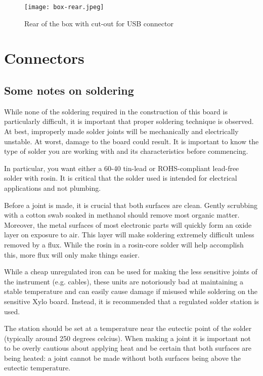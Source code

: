 \begin{figure}
  \center
  \texttt{[image: box-rear.jpeg]}
  \caption{Rear of the box with cut-out for USB connector}
  \label{fig:box-rear}
\end{figure}

\section{Connectors}

\subsection{Some notes on soldering}

While none of the soldering required in the construction of this board
is particularly difficult, it is important that proper soldering
technique is observed. At best, improperly made solder joints will be
mechanically and electrically unstable. At worst, damage to the board
could result. It is important to know the type of solder you are
working with and its characteristics before commencing.

In particular, you want either a 60-40 tin-lead or ROHS-compliant
lead-free solder with rosin. It is critical that the 
solder used is intended for electrical applications and not plumbing.

Before a joint is made, it is crucial that both surfaces are
clean. Gently scrubbing with a cotton swab soaked in methanol should
remove most organic matter. Moreover, the metal surfaces of most
electronic parts will quickly form an oxide layer on exposure to
air. This layer will make soldering extremely difficult unless removed
by a flux. While the rosin in a rosin-core solder will help accomplish
this, more flux will only make things easier.

While a cheap unregulated iron can be used for making the less
sensitive joints of the instrument (e.g. cables), these units are
notoriously bad at maintaining a stable temperature and can easily
cause damage if misused while soldering on the sensitive Xylo
board. Instead, it is recommended that a regulated solder station is
used.

The station should be set at a temperature near the eutectic point of
the solder (typically around 250 degrees celcius). When making a
joint it is important not to be overly cautious about applying heat
and be certain that both surfaces are being heated: a joint cannot be
made without both surfaces being above the eutectic temperature.

